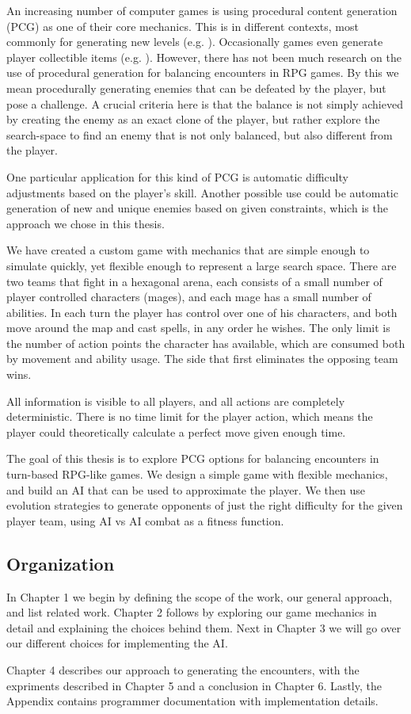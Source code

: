 
An increasing number of computer games is using procedural content generation
(PCG) as one of their core mechanics. This is in different contexts, most
commonly for generating new levels (e.g. \citet{diablo}).  Occasionally games
even generate player collectible items (e.g. \citet{borderlands}). However,
there has not been much research on the use of procedural generation for
balancing encounters in RPG games. By this we mean procedurally generating
enemies that can be defeated by the player, but pose a challenge. A crucial
criteria here is that the balance is not simply achieved by creating the enemy
as an exact clone of the player, but rather explore the search-space to find an
enemy that is not only balanced, but also different from the player.

One particular application for this kind of PCG is automatic difficulty
adjustments based on the player's skill. Another possible use could be
automatic generation of new and unique enemies based on given constraints,
which is the approach we chose in this thesis.

We have created a custom game with mechanics that are simple enough to simulate
quickly, yet flexible enough to represent a large search space. There are two
teams that fight in a hexagonal arena, each consists of a small number of
player controlled characters (mages), and each mage has a small number of
abilities. In each turn the player has control over one of his characters, and
both move around the map and cast spells, in any order he wishes. The only
limit is the number of action points the character has available, which are
consumed both by movement and ability usage. The side that first eliminates the
opposing team wins.

All information is visible to all players, and all actions are completely
deterministic. There is no time limit for the player action, which means the
player could theoretically calculate a perfect move given enough time.

The goal of this thesis is to explore PCG options for balancing encounters in
turn-based RPG-like games. We design a simple game with flexible mechanics, and
build an AI that can be used to approximate the player. We then use evolution strategies
to generate opponents of just the right difficulty for the given player team, using AI vs
AI combat as a fitness function.

\subsection*{Organization}

In Chapter 1 we begin by defining the scope of the work, our general approach,
and list related work. Chapter 2 follows by exploring our game mechanics in
detail and explaining the choices behind them. Next in Chapter 3 we will go
over our different choices for implementing the AI.

Chapter 4 describes our approach to generating the encounters, with the expriments
described in Chapter 5 and a conclusion in Chapter 6. Lastly, the Appendix contains
programmer documentation with implementation details.
